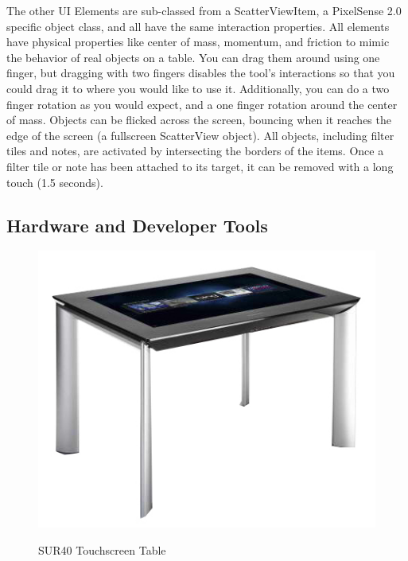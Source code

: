 \documentclass{article}
\begin{document}
The other UI Elements are sub-classed from a ScatterViewItem, a PixelSense 2.0 specific object class, and all have the same interaction properties.  All elements have physical properties like center of mass, momentum, and friction to mimic the behavior of real objects on a table.  You can drag them around using one finger, but dragging with two fingers  disables the tool's interactions so that you could drag it to where you would like to use it.  Additionally, you can do a two finger rotation as you would expect, and a one finger rotation around the center of mass.  Objects can be flicked across the screen, bouncing when it reaches the edge of the screen (a fullscreen ScatterView object).  All objects, including filter tiles and notes, are activated by intersecting the borders of the items.  Once a filter tile or note has been attached to its target, it can be removed with a long touch (1.5 seconds).  

\subsection{Hardware and Developer Tools}

\begin{figure}[t!]
\centering
\scalebox{1}
{\includegraphics{SUR40.jpg}}
\caption{SUR40 Touchscreen Table}
\label{Fig:table}
\end{figure}
\end{document}
